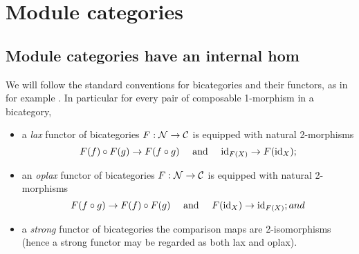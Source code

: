 \documentclass{amsart}
\begin{document}


\section{Module categories} \label{sec:tc-bimod}

\subsection{Module categories have an internal hom} 

We will follow the standard conventions for bicategories and their functors, as in for example \cite{MR2664622}. In particular for every pair of composable 1-morphism in a bicategory, 
\begin{itemize}
	\item a {\em lax} functor of bicategories $F: \mathcal N \to \mathcal C$ is equipped with natural 2-morphisms
	\begin{equation*}
		F(f) \circ F(g) \to F(f \circ g) \quad \textrm{ and } \quad \mathrm{id}_{F(X)} \to F(\mathrm{id}_X);
	\end{equation*} 
	\item an {\em oplax} functor of bicategories $F: \mathcal N \to \mathcal C$ is equipped with natural 2-morphisms
	\begin{equation*}
		F(f \circ g) \to F(f) \circ F(g)   \quad \textrm{ and } \quad F(\mathrm{id}_X) \to \mathrm{id}_{F(X)}; and
	\end{equation*}
	\item a {\em strong} functor of bicategories the comparison maps are 2-isomorphisms (hence a strong functor may be regarded as both lax and oplax). 
\end{itemize}
\end{document}
